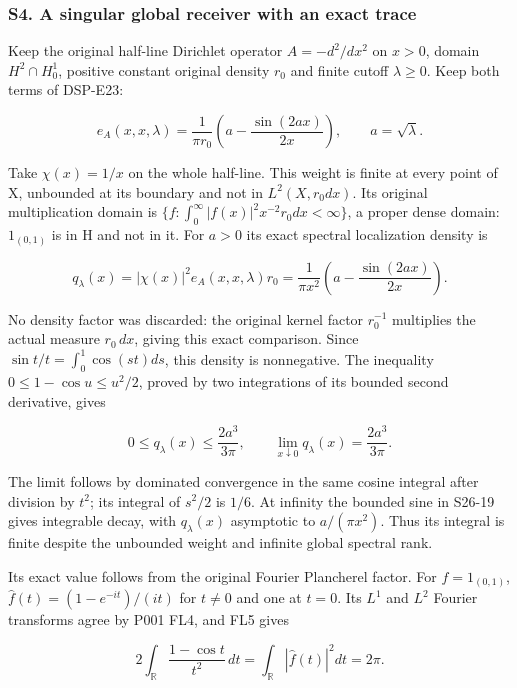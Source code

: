 \documentclass[
  11pt,
]{article}
\makeatletter
\let\ReaderOriginalAnchorStart\hyper@anchorstart
\let\ReaderOriginalAnchorEnd\hyper@anchorend
\let\ReaderPendingAliases\@empty
\def\ReaderArmAliases#1{\gdef\ReaderPendingAliases{#1}}
\def\hyper@anchorstart#1{\ReaderIfNativeAnchorTF{#1}{\ReaderPendingAliases\global\let\ReaderPendingAliases\@empty}{}\ReaderOriginalAnchorStart{#1}}
\makeatother
\begin{document}
\ReaderArmAliases{\ReaderOriginalAnchorStart{s4.-a-singular-global-receiver-with-an-exact-trace}\ReaderOriginalAnchorEnd}
\subsubsection{S4. A singular global receiver with an exact
trace}\label{s4.-a-singular-global-receiver-with-an-exact-trace}

Keep the original half-line Dirichlet operator \(A=-d^2/dx^2\) on
\(x>0\), domain \(H^2\cap H_0^1\), positive constant original density
\(r_0\) and finite cutoff \(\lambda\ge0\). Keep both terms of DSP-E23:

\[
e_A(x,x,\lambda)
=\frac1{\pi r_0}
 \left(a-\frac{\sin(2ax)}{2x}\right),
\qquad a=\sqrt\lambda.
\tag{S26-18}
\]

Take \(\chi(x)=1/x\) on the whole half-line. This weight is finite at
every point of X, unbounded at its boundary and not in \(L^2(X,r_0dx)\).
Its original multiplication domain is
\(\{f:\int_0^\infty |f(x)|^2x^{-2}r_0dx<\infty\}\), a proper dense
domain: \(1_{(0,1)}\) is in H and not in it. For \(a>0\) its exact
spectral localization density is

\[
q_\lambda(x)=|\chi(x)|^2 e_A(x,x,\lambda)r_0
=\frac1{\pi x^2}\left(a-\frac{\sin(2ax)}{2x}\right).
\tag{S26-19}
\]

No density factor was discarded: the original kernel factor \(r_0^{-1}\)
multiplies the actual measure \(r_0\,dx\), giving this exact comparison.
Since \(\sin t/t=\int_0^1\cos(st)ds\), this density is nonnegative. The
inequality \(0\le1-\cos u\le u^2/2\), proved by two integrations of its
bounded second derivative, gives

\[
0\le q_\lambda(x)\le\frac{2a^3}{3\pi},\qquad
\lim_{x\downarrow0}q_\lambda(x)=\frac{2a^3}{3\pi}.
\tag{S26-20}
\]

The limit follows by dominated convergence in the same cosine integral
after division by \(t^2\); its integral of \(s^2/2\) is \(1/6\). At
infinity the bounded sine in S26-19 gives integrable decay, with
\(q_\lambda(x)\) asymptotic to \(a/(\pi x^2)\). Thus its integral is
finite despite the unbounded weight and infinite global spectral rank.

Its exact value follows from the original Fourier Plancherel factor. For
\(f=1_{(0,1)}\), \(\widehat f(t)=(1-e^{-it})/(it)\) for \(t\ne0\) and
one at \(t=0\). Its \(L^1\) and \(L^2\) Fourier transforms agree by P001
FL4, and FL5 gives

\[
2\int_{\mathbb R}\frac{1-\cos t}{t^2}\,dt
=\int_{\mathbb R}|\widehat f(t)|^2dt=2\pi.
\tag{S26-21}
\]
\end{document}
